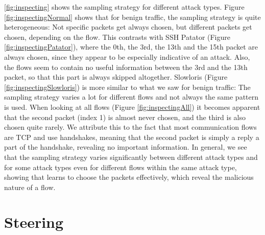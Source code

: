 \documentclass[conference]{IEEEtran}
\begin{document}
\autoref{fig:inspecting} shows the sampling strategy for different attack types. Figure \ref{fig:inspectingNormal} shows that for benign traffic, the sampling strategy is quite heterogeneous: Not specific packets get always chosen, but different packets get chosen, depending on the flow. This contrasts with SSH Patator (Figure \ref{fig:inspectingPatator}), where the 0th, the 3rd, the 13th and the 15th packet are always chosen, since they appear to be especially indicative of an attack. Also, the flows seem to contain no useful information between the 3rd and the 13th packet, so that this part is always skipped altogether. Slowloris (Figure \ref{fig:inspectingSlowloris}) is more similar to what we saw for benign traffic: The sampling strategy varies a lot for different flows and not always the same pattern is used. When looking at all flows (Figure \ref{fig:inspectingAll}) it becomes apparent that the second packet (index 1) is almost never chosen, and the third is also chosen quite rarely. We attribute this to the fact that most communication flows are TCP and use handshakes, meaning that the second packet is simply a reply a part of the handshake, revealing no important information. In general, we see that the sampling strategy varies significantly between different attack types and for some attack types even for different flows within the same attack type, showing that \ours{} learns to choose the packets effectively, which reveal the malicious nature of a flow.


\section{Steering}
\end{document}
